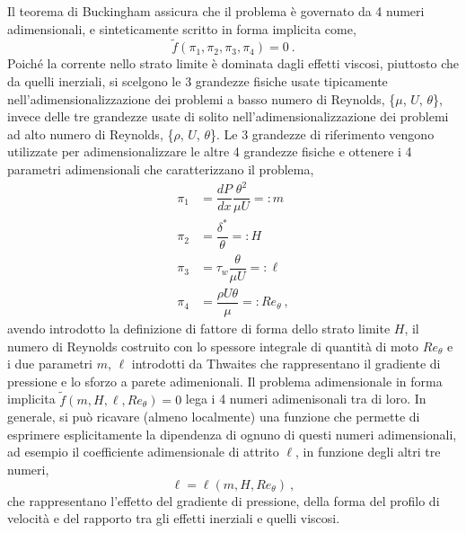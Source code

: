 Il teorema di Buckingham assicura che il problema è governato da 4 numeri adimensionali, e sinteticamente scritto in forma implicita come,
\begin{equation}
  \tilde{f}(\pi_1, \pi_2, \pi_3, \pi_4) = 0 \ .
\end{equation}
Poiché la corrente nello strato limite è dominata dagli effetti viscosi, piuttosto che da quelli inerziali, si scelgono le 3 grandezze fisiche usate tipicamente nell'adimensionalizzazione dei problemi a basso numero di Reynolds, \{$\mu$, $U$, $\theta$\}, invece delle tre grandezze usate di solito nell'adimensionalizzazione dei problemi ad alto numero di Reynolds, \{$\rho$, $U$, $\theta$\}.
Le 3 grandezze di riferimento vengono utilizzate per adimensionalizzare le altre 4 grandezze fisiche e ottenere i 4 parametri adimensionali che caratterizzano il problema,
\begin{equation}
\begin{aligned}
 \pi_1 & = \dfrac{dP}{dx} \dfrac{\theta^2}{\mu U} =: m \\
 \pi_2 & = \dfrac{\delta^*}{\theta}               =: H \\
 \pi_3 & = \tau_w \dfrac{\theta}{\mu U}           =: \ell \\
 \pi_4 & = \dfrac{\rho U \theta}{\mu}             =: Re_{\theta} \ ,
\end{aligned}
\end{equation}
%
avendo introdotto la definizione di fattore di forma dello strato limite $H$, il numero di Reynolds costruito con lo spessore integrale di quantità di moto $Re_{\theta}$ e i due parametri $m$, $\ell$ introdotti da Thwaites che rappresentano il gradiente di pressione e lo sforzo a parete adimenionali. Il problema adimensionale in forma implicita $\tilde{f}(m, H, \ell, Re_{\theta}) = 0$ lega i 4 numeri adimenisonali tra di loro. In generale, si può ricavare (almeno localmente) una funzione che permette di esprimere esplicitamente la dipendenza di ognuno di questi numeri adimensionali, ad esempio il coefficiente adimensionale di attrito $\ell$, in funzione degli altri tre numeri,
\begin{equation}
 \ell = \ell( m, H, Re_{\theta} ) \ ,
\end{equation}
che rappresentano l'effetto del gradiente di pressione, della forma del profilo di velocità e del rapporto tra gli effetti inerziali e quelli viscosi.

